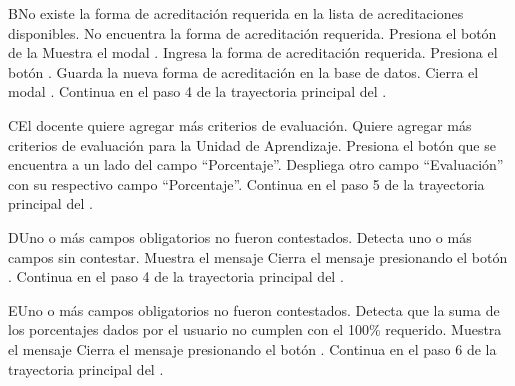 
\begin{UCtrayectoriaA}{B}{No existe la forma de acreditación requerida en la lista de acreditaciones disponibles.}
    \UCpaso[\UCactor] No encuentra la forma de acreditación requerida.
    \UCpaso[\UCactor] Presiona el botón  de la 
    \UCpaso Muestra el modal .
    \UCpaso[\UCactor] Ingresa la forma de acreditación requerida.
    \UCpaso[\UCactor] Presiona el botón .
    \UCpaso Guarda la nueva forma de acreditación en la base de datos.
    \UCpaso Cierra el modal .
    \UCpaso Continua en el paso 4 de la trayectoria principal del .
\end{UCtrayectoriaA}




\begin{UCtrayectoriaA}{C}{El docente quiere agregar más criterios de evaluación.}
	\UCpaso[\UCactor] Quiere agregar más criterios de evaluación para la Unidad de Aprendizaje.
	\UCpaso[\UCactor] Presiona el botón  que se encuentra a un lado del campo ``Porcentaje''.
	\UCpaso Despliega otro campo ``Evaluación'' con su respectivo campo ``Porcentaje''.
	\UCpaso Continua en el paso 5 de la trayectoria principal del .
\end{UCtrayectoriaA}



\begin{UCtrayectoriaA}{D}{Uno o más campos obligatorios no fueron contestados.}
	\UCpaso Detecta uno o más campos sin contestar.
    \UCpaso Muestra el mensaje 
    \UCpaso[\UCactor] Cierra el mensaje presionando el botón .
    \UCpaso Continua en el paso 4 de la trayectoria principal del .
\end{UCtrayectoriaA}



\begin{UCtrayectoriaA}{E}{Uno o más campos obligatorios no fueron contestados.}
	\UCpaso Detecta que la suma de los porcentajes dados por el usuario no cumplen con el 100\% requerido.
    \UCpaso Muestra el mensaje 
    \UCpaso[\UCactor] Cierra el mensaje presionando el botón .
    \UCpaso Continua en el paso 6 de la trayectoria principal del .
\end{UCtrayectoriaA}

